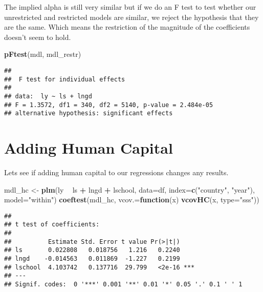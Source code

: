 \documentclass[]{article}
\newenvironment{Shaded}{\begin{snugshade}}{\end{snugshade}}
\newcommand{\KeywordTok}[1]{\textcolor[rgb]{0.13,0.29,0.53}{\textbf{#1}}}
\newcommand{\DataTypeTok}[1]{\textcolor[rgb]{0.13,0.29,0.53}{#1}}
\newcommand{\StringTok}[1]{\textcolor[rgb]{0.31,0.60,0.02}{#1}}
\newcommand{\ControlFlowTok}[1]{\textcolor[rgb]{0.13,0.29,0.53}{\textbf{#1}}}
\newcommand{\OperatorTok}[1]{\textcolor[rgb]{0.81,0.36,0.00}{\textbf{#1}}}
\newcommand{\NormalTok}[1]{#1}
\begin{document}
The implied alpha is still very similar but if we do an F test to test
whether our unrestricted and restricted models are similar, we reject
the hypothesis that they are the same. Which means the restriction of
the magnitude of the coefficients doesn't seem to hold.

\begin{Shaded}
\begin{Highlighting}[]
\KeywordTok{pFtest}\NormalTok{(mdl, mdl_restr)}
\end{Highlighting}
\end{Shaded}

\begin{verbatim}
## 
##  F test for individual effects
## 
## data:  ly ~ ls + lngd
## F = 1.3572, df1 = 340, df2 = 5140, p-value = 2.484e-05
## alternative hypothesis: significant effects
\end{verbatim}

\section{Adding Human Capital}\label{adding-human-capital}

Lets see if adding human capital to our regressions changes any results.

\begin{Shaded}
\begin{Highlighting}[]
\NormalTok{mdl_hc <-}\StringTok{ }\KeywordTok{plm}\NormalTok{(ly }\OperatorTok{~}\StringTok{ }\NormalTok{ls }\OperatorTok{+}\StringTok{ }\NormalTok{lngd }\OperatorTok{+}\StringTok{ }\NormalTok{lschool, }\DataTypeTok{data=}\NormalTok{df, }\DataTypeTok{index=}\KeywordTok{c}\NormalTok{(}\StringTok{"country"}\NormalTok{, }\StringTok{"year"}\NormalTok{), }\DataTypeTok{model=}\StringTok{"within"}\NormalTok{)}
\KeywordTok{coeftest}\NormalTok{(mdl_hc, }\DataTypeTok{vcov.=}\ControlFlowTok{function}\NormalTok{(x) }\KeywordTok{vcovHC}\NormalTok{(x, }\DataTypeTok{type=}\StringTok{"sss"}\NormalTok{))}
\end{Highlighting}
\end{Shaded}

\begin{verbatim}
## 
## t test of coefficients:
## 
##          Estimate Std. Error t value Pr(>|t|)    
## ls       0.022808   0.018756   1.216   0.2240    
## lngd    -0.014563   0.011869  -1.227   0.2199    
## lschool  4.103742   0.137716  29.799   <2e-16 ***
## ---
## Signif. codes:  0 '***' 0.001 '**' 0.01 '*' 0.05 '.' 0.1 ' ' 1
\end{verbatim}
\end{document}
